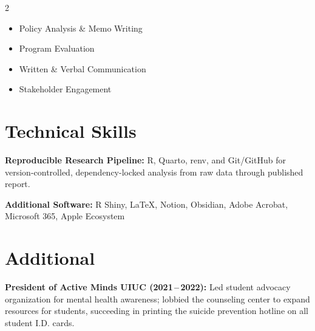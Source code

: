 \documentclass[9pt]{extarticle}
\newcommand{\cvdetail}[1]{{\fontsize{8.5}{10.5}\selectfont\color{cvmid}#1}\par\vspace{2pt}}
\begin{document}
\begin{multicols}{2}
\begin{itemize}
  \item Policy Analysis \& Memo Writing
  \item Program Evaluation
  \item Written \& Verbal Communication
  \item Stakeholder Engagement
\end{itemize}
\end{multicols}

\section*{Technical Skills}

\cvdetail{\textbf{Reproducible Research Pipeline:} R, Quarto, renv, and Git/GitHub for version-controlled, dependency-locked analysis from raw data through published report.}
\cvdetail{\textbf{Additional Software:} R Shiny, LaTeX, Notion, Obsidian, Adobe Acrobat, Microsoft 365, Apple Ecosystem}

\section*{Additional}

\cvdetail{\textbf{President of Active Minds UIUC (2021\,--\,2022):} Led student advocacy organization for mental health awareness; lobbied the counseling center to expand resources for students, succeeding in printing the suicide prevention hotline on all student I.D. cards.}
\end{document}
